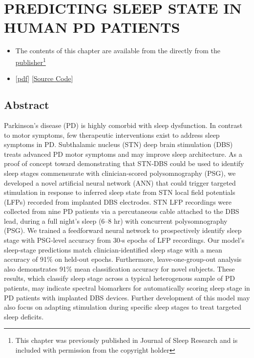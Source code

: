 \documentclass{templates/ucdenverthesis}
\begin{document}
\hypertarget{ch3:jsr}{%
\chapter{PREDICTING SLEEP STATE IN HUMAN PD PATIENTS}\label{ch3:jsr}}

\begin{itemize}
\item
  The contents of this chapter are available from the directly from the \href{https://doi.org/10.1111/jsr.12806}{publisher}\footnote{This chapter was previously published in \autocite{Christensen:2019ik} Journal of Sleep Research and is included with permission from the copyright holder}
\item
  {[}\href{http://www.jzlab.org/Christensen_JSleepResearch2018_LFP_ANN_DBS.pdf}{pdf}{]} {[}\href{https://github.com/jzlab/sleep_net}{Source Code}{]}
\end{itemize}

\hypertarget{abstract}{%
\section{Abstract}\label{abstract}}

Parkinson's disease (PD) is highly comorbid with sleep dysfunction. In contrast to motor symptoms, few therapeutic interventions exist to address sleep symptoms in PD. Subthalamic nucleus (STN) deep brain stimulation (DBS) treats advanced PD motor symptoms and may improve sleep architecture. As a proof of concept toward demonstrating that STN‐DBS could be used to identify sleep stages commensurate with clinician‐scored polysomnography (PSG), we developed a novel artificial neural network (ANN) that could trigger targeted stimulation in response to inferred sleep state from STN local field potentials (LFPs) recorded from implanted DBS electrodes. STN LFP recordings were collected from nine PD patients via a percutaneous cable attached to the DBS lead, during a full night's sleep (6--8 hr) with concurrent polysomnography (PSG). We trained a feedforward neural network to prospectively identify sleep stage with PSG‐level accuracy from 30‐s epochs of LFP recordings. Our model's sleep‐stage predictions match clinician‐identified sleep stage with a mean accuracy of 91\% on held‐out epochs. Furthermore, leave‐one‐group‐out analysis also demonstrates 91\% mean classification accuracy for novel subjects. These results, which classify sleep stage across a typical heterogenous sample of PD patients, may indicate spectral biomarkers for automatically scoring sleep stage in PD patients with implanted DBS devices. Further development of this model may also focus on adapting stimulation during specific sleep stages to treat targeted sleep deficits.
\end{document}
